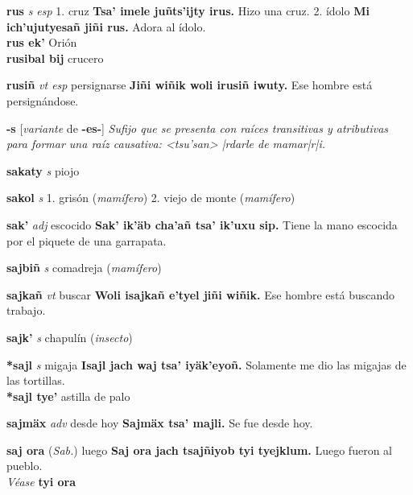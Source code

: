 \documentclass[10pt]{scrbook}
\newcommand{\entry}[1]{\textbf{#1}}
\newcommand{\alphaletter}[1]{\end{multicols}\addsec{#1}\begin{multicols}{2}}
\newcommand{\onedefinition}[1]{#1.}
\newcommand{\nontranslationdef}[1]{\textit{#1}}
\newcommand{\partofspeech}[1]{\textit{#1}}
\newcommand{\spanishtranslation}[1]{#1}
\newcommand{\clarification}[1]{(\textit{#1})}
\newcommand{\cholexample}[1]{\textbf{#1}}
\newcommand{\exampletranslation}[1]{#1}
\newcommand{\alsosee}[1]{\\\textit{Véase} \textbf{#1}}
\newcommand{\relevantdialect}[1]{(\textit{#1})}
\newcommand{\secondaryentry}[1]{\\\textbf{#1}}
\newcommand{\secondtranslation}[1]{#1}
\newcommand{\conjugationtense}[1]{[\textit{#1}}
\newcommand{\conjugationverb}[1]{de \textbf{#1}]}
\begin{document}
\begin{multicols}{2}
\entry{rus}
\partofspeech{s esp}
\onedefinition{1}
\spanishtranslation{cruz}
\cholexample{Tsa' imele juñts'ijty irus.}
\exampletranslation{Hizo una cruz.}
\onedefinition{2}
\spanishtranslation{ídolo}
\cholexample{Mi ich'ujutyesañ jiñi rus.}
\exampletranslation{Adora al ídolo.}
\secondaryentry{rus ek'}
\secondtranslation{Orión}
\secondaryentry{rusibal bij}
\secondtranslation{crucero}

\entry{rusiñ}
\partofspeech{vt esp}
\spanishtranslation{persignarse}
\cholexample{Jiñi wiñik woli irusiñ iwuty.}
\exampletranslation{Ese hombre está persignándose.}

\alphaletter{S}

\entry{-s}
\conjugationtense{variante}
\conjugationverb{-es-}
\nontranslationdef{Sufijo que se presenta con raíces transitivas y atributivas para formar una raíz causativa: <tsu'san> |rdarle de mamar|r|i.}

\entry{sakaty}
\partofspeech{s}
\spanishtranslation{piojo}

\entry{sakol}
\partofspeech{s}
\onedefinition{1}
\spanishtranslation{grisón}
\clarification{mamífero}
\onedefinition{2}
\spanishtranslation{viejo de monte}
\clarification{mamífero}

\entry{sak'}
\partofspeech{adj}
\spanishtranslation{escocido}
\cholexample{Sak' ik'äb cha'añ tsa' ik'uxu sip.}
\exampletranslation{Tiene la mano escocida por el piquete de una garrapata.}

\entry{sajbiñ}
\partofspeech{s}
\spanishtranslation{comadreja}
\clarification{mamífero}

\entry{sajkañ}
\partofspeech{vt}
\spanishtranslation{buscar}
\cholexample{Woli isajkañ e'tyel jiñi wiñik.}
\exampletranslation{Ese hombre está buscando trabajo.}

\entry{sajk'}
\partofspeech{s}
\spanishtranslation{chapulín}
\clarification{insecto}

\entry{*sajl}
\partofspeech{s}
\spanishtranslation{migaja}
\cholexample{Isajl jach waj tsa' iyäk'eyoñ.}
\exampletranslation{Solamente me dio las migajas de las tortillas.}
\secondaryentry{*sajl tye'}
\secondtranslation{astilla de palo}

\entry{sajmäx}
\partofspeech{adv}
\spanishtranslation{desde hoy}
\cholexample{Sajmäx tsa' majli.}
\exampletranslation{Se fue desde hoy.}

\entry{saj ora}
\relevantdialect{Sab.}
\spanishtranslation{luego}
\cholexample{Saj ora jach tsajñiyob tyi tyejklum.}
\exampletranslation{Luego fueron al pueblo.}
\alsosee{tyi ora}


\end{multicols}
\end{document}
